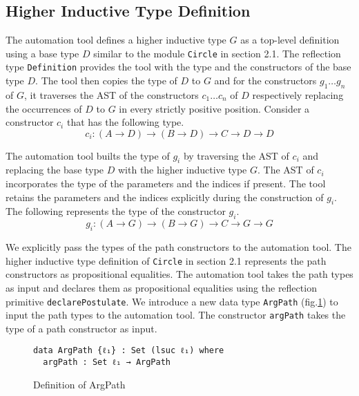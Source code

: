 \documentclass[sigplan,10pt]{acmart}
\begin{document}
\subsection{Higher Inductive Type Definition}
\label{sec:sec4.1}

The automation tool defines a higher inductive type $G$ as a top-level definition using a base type $D$ similar to the module {\tt Circle} in section 2.1. The reflection type {\tt Definition} provides the tool with the type and the constructors of the base type $D$. The tool then copies the type of $D$ to $G$ and for the constructors $g_1 \ldots g_n$ of $G$, it traverses the AST of the constructors $c_1 \ldots c_n$ of $D$ respectively replacing the occurrences of $D$ to $G$ in every strictly positive position. Consider a constructor $c_i$ that has the following type.
\begin{equation}
c_i : (A \rightarrow D) \rightarrow (B \rightarrow D) \rightarrow C \rightarrow D \rightarrow D \nonumber
\end{equation}

The automation tool builts the type of $g_i$ by traversing the AST of $c_i$ and replacing the base type $D$ with the higher inductive type $G$. The AST of $c_i$ incorporates the type of the parameters and the indices if present. The tool retains the parameters and the indices explicitly during the construction of $g_i$. The following represents the type of the constructor $g_i$.
\begin{equation}
g_i : (A \rightarrow G) \rightarrow (B \rightarrow G) \rightarrow C \rightarrow G \rightarrow G \nonumber
\end{equation}

We explicitly pass the types of the path constructors to the automation tool. The higher inductive type definition of {\tt Circle} in section 2.1 represents the path constructors as propositional equalities. The automation tool takes the path types as input and declares them as propositional equalities using the reflection primitive {\tt declarePostulate}. We introduce a new data type {\tt ArgPath} (fig.\ref{fig:argPath}) to input the path types to the automation tool. The constructor {\tt argPath} takes the type of a path constructor as input.

\begin{figure}
\begin{center}
\begingroup
\begin{BVerbatim}
data ArgPath {ℓ₁} : Set (lsuc ℓ₁) where
  argPath : Set ℓ₁ → ArgPath
\end{BVerbatim}
\endgroup
\end{center}
\caption{Definition of ArgPath}
\label{fig:argPath}
\end{figure}
\end{document}
